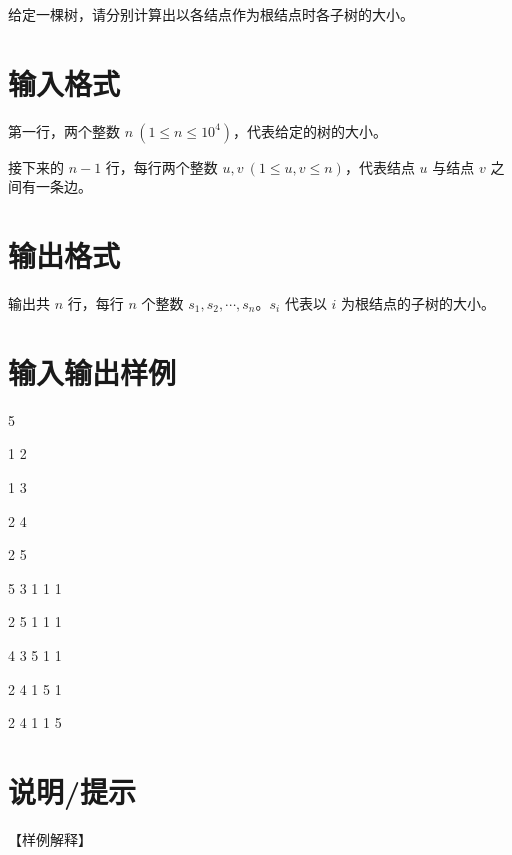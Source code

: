 \documentclass{ctpro}
\begin{document}
给定一棵树，请分别计算出以各结点作为根结点时各子树的大小。

\section*{输入格式}
第一行，两个整数 $n~(1 \leq n \leq 10^4)$，代表给定的树的大小。

接下来的 $n-1$ 行，每行两个整数 $u,v~(1 \leq u,v \leq n)$，代表结点 $u$ 与结点 $v$ 之间有一条边。

\section*{输出格式}
输出共 $n$ 行，每行 $n$ 个整数 $s_1,s_2,\cdots,s_n$。$s_i$ 代表以 $i$ 为根结点的子树的大小。

\section*{输入输出样例}
\testcasetab
{
	5\par
	1 2\par
	1 3\par
	2 4\par
	2 5
}
{
	5 3 1 1 1\par
	2 5 1 1 1\par
	4 3 5 1 1\par
	2 4 1 5 1\par
	2 4 1 1 5
}

\section*{说明/提示}
【样例解释】
\end{document}
